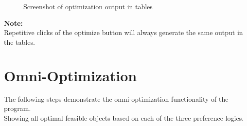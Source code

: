 \documentclass[12pt]{report}
\begin{document}
\begin{description}[leftmargin=4em]
\begin{figure}[H]
\begin{center}
\caption{Screenshot of optimization output in tables}
\end{center}
\end{figure}
\vspace{-2.5em}
\end{description}

\textbf{Note:} \\
Repetitive clicks of the optimize button will always generate the same output in the tables.

\newpage
\section{Omni-Optimization}
The following steps demonstrate the omni-optimization functionality of the program. \\
Showing all optimal feasible objects based on each of the three preference logics.\\
\end{document}

